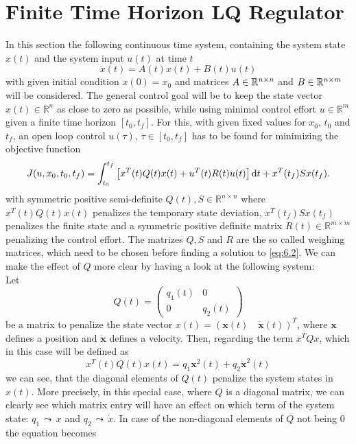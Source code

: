 \documentclass[paper=a4, pagesize, DIV=calc, BCOR=12.5mm, twoside=on, onecolumn=on, open = any, titlepage =on, parskip =half-, headsepline = on, footsepline = on, chapterprefix = on, appendixprefix = off, fontsize = 12pt, numbers = noenddot, abstract = on]{scrbook}
\numberwithin{equation}{chapter}
\theoremstyle{definition}
\theoremstyle{plain}
\theoremstyle{plain}
\theoremstyle{remark}
\theoremstyle{plain}
\theoremstyle{plain}
\begin{document}
\section{Finite Time Horizon LQ Regulator}
\label{sec:FTHLQR}
\onehalfspacing
In this section the following continuous time system, containing the system state $x(t)$ and the system input $u(t)$ at time $t$ 
\begin{equation}
\dot{x}(t) = A(t)x(t) + B(t)u(t) \label{eq:6.1}
\end{equation}
with given initial condition $x(0) = x_0$ and matrices $A \in \mathbb{R}^{n\times n}$ and $B \in \mathbb{R}^{n \times m}$ will be considered. The general control goal will be to keep the state vector $x(t) \in \mathbb{R}^n$ as close to zero as possible, while using minimal control effort $u \in \mathbb{R}^m$ given a finite time horizon $\left[ t_0, t_f\right] $. For this, with given fixed values for $x_0$, $t_0$ and $t_f$, an open loop control $u(\tau)$, $\tau \in\left[ t_0, t_f\right] $ has to be found for minimizing the objective function
\begin{equation}
J(u, x_0, t_0, t_f) = \int_{t_0}^{t_f} \left[ x^T(t)Q(t)x(t) + u^T(t)R(t)u(t) \right] \mathop{}\!\mathrm{d} t + x^T(t_f)Sx(t_f). \label{eq:6.2}
\end{equation}
with symmetric positive semi-definite $Q(t), S \in \mathbb{R}^{n \times n}$ where $x^T(t)Q(t)x(t)$ penalizes the temporary state deviation, $x^T(t_f)Sx(t_f)$ penalizes the finite state and a symmetric positive definite matrix $R(t) \in \mathbb{R}^{m \times m}$ penalizing the control effort. The matrizes $Q, S$ and $R$ are the so called weighing matrices, which need to be chosen before finding a solution to \eqref{eq:6.2}. We can make the effect of $Q$ more clear by having a look at the following system:\\
Let \[
Q(t) = \begin{pmatrix}
q_1(t) & 0\\
0 & q_2(t)
\end{pmatrix}
\] be a matrix to penalize the state vector $x(t) = \left( \mathbf{x}(t) \quad \dot{\mathbf{x}}(t) \right)^T$, where $\mathbf{x}$ defines a position and $\dot{\mathbf{x}}$ defines a velocity. Then, regarding the term $x^TQx$, which in this case will be defined as
\[
x^T(t)Q(t)x(t) = q_1\mathbf{x}^2(t) + q_2\dot{\mathbf{x}}^2(t)
\] we can see, that the diagonal elements of $Q(t)$ penalize the system states in $x(t)$. More precisely, in this special case, where $Q$ is a diagonal matrix, we can clearly see which matrix entry will have an effect on which term of the system state: $q_1 \, \leadsto \, x$ and $q_2 \, \leadsto \, \dot{x}$. In case of the non-diagonal elements of $Q$ not being $0$ the equation becomes 
\end{document}
